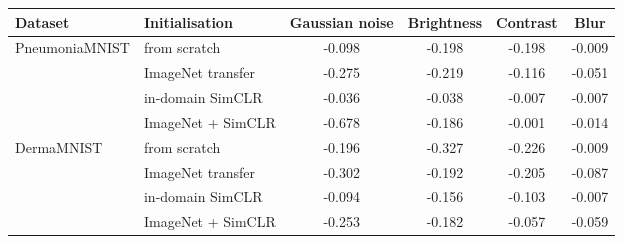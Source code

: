 \begin{tabular}{llcccc}
\toprule
Dataset & Initialisation & Gaussian noise & Brightness & Contrast & Blur \\
\midrule
PneumoniaMNIST & from scratch & -0.098 & -0.198 & -0.198 & -0.009 \\
 & ImageNet transfer & -0.275 & -0.219 & -0.116 & -0.051 \\
 & in-domain SimCLR & -0.036 & -0.038 & -0.007 & -0.007 \\
 & ImageNet + SimCLR & -0.678 & -0.186 & -0.001 & -0.014 \\
\midrule
DermaMNIST & from scratch & -0.196 & -0.327 & -0.226 & -0.009 \\
 & ImageNet transfer & -0.302 & -0.192 & -0.205 & -0.087 \\
 & in-domain SimCLR & -0.094 & -0.156 & -0.103 & -0.007 \\
 & ImageNet + SimCLR & -0.253 & -0.182 & -0.057 & -0.059 \\
\bottomrule
\end{tabular}